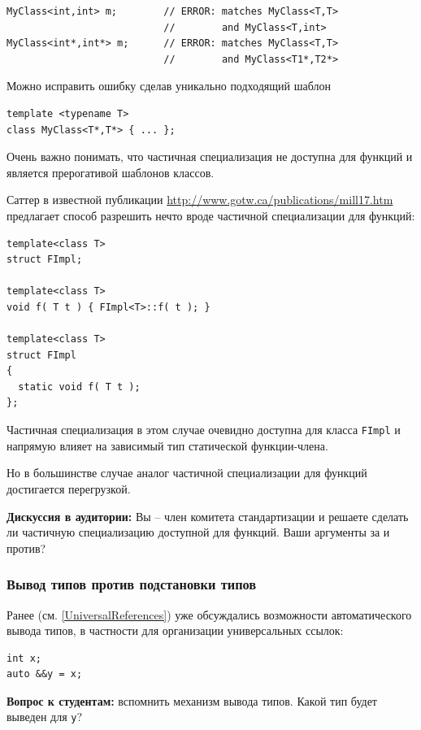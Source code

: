\documentclass[a4paper,12pt,oneside]{article}
\begin{document}
\begin{lstlisting}
MyClass<int,int> m;        // ERROR: matches MyClass<T,T> 
                           //        and MyClass<T,int> 
MyClass<int*,int*> m;      // ERROR: matches MyClass<T,T> 
                           //        and MyClass<T1*,T2*>
\end{lstlisting}

Можно исправить ошибку сделав уникально подходящий шаблон

\begin{lstlisting}
template <typename T> 
class MyClass<T*,T*> { ... };
\end{lstlisting}

Очень важно понимать, что частичная специализация не доступна для функций и является прерогативой шаблонов классов.

Саттер в известной публикации \url{http://www.gotw.ca/publications/mill17.htm} предлагает способ разрешить нечто вроде частичной специализации для функций:

\begin{lstlisting}
template<class T> 
struct FImpl;

template<class T> 
void f( T t ) { FImpl<T>::f( t ); } 

template<class T> 
struct FImpl 
{ 
  static void f( T t ); 
};
\end{lstlisting}

Частичная специализация в этом случае очевидно доступна для класса \lstinline!FImpl! и напрямую влияет на зависимый тип статической функции-члена.

Но в большинстве случае аналог частичной специализации для функций достигается перегрузкой.

\textbf{Дискуссия в аудитории:} Вы -- член комитета стандартизации и решаете сделать ли частичную специализацию доступной для функций. Ваши аргументы за и против?

\subsubsection{Вывод типов против подстановки типов}

Ранее (см. \ref{UniversalReferences}) уже обсуждались возможности автоматического вывода типов, в частности для организации универсальных ссылок:

\begin{lstlisting}
int x;
auto &&y = x;
\end{lstlisting}

\textbf{Вопрос к студентам:} вспомнить механизм вывода типов. Какой тип будет выведен для \lstinline!y!?
\end{document}
